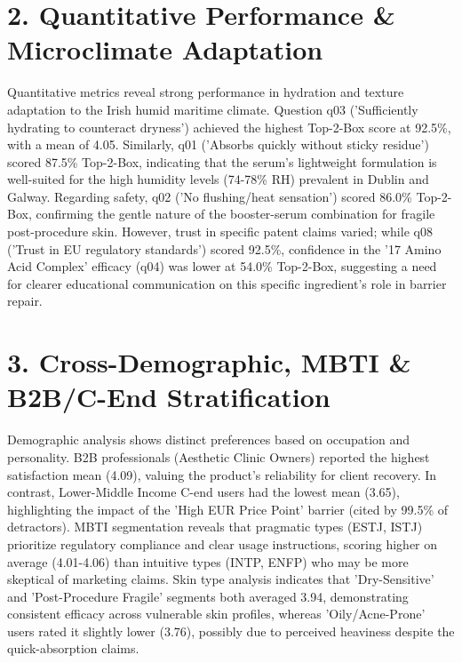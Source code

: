\documentclass[10pt,twocolumn,a4paper]{article}
\begin{document}
\section{2. Quantitative Performance \& Microclimate Adaptation}
Quantitative metrics reveal strong performance in hydration and texture adaptation to the Irish humid maritime climate. Question q03 ('Sufficiently hydrating to counteract dryness') achieved the highest Top-2-Box score at 92.5\%, with a mean of 4.05. Similarly, q01 ('Absorbs quickly without sticky residue') scored 87.5\% Top-2-Box, indicating that the serum's lightweight formulation is well-suited for the high humidity levels (74-78\% RH) prevalent in Dublin and Galway. Regarding safety, q02 ('No flushing/heat sensation') scored 86.0\% Top-2-Box, confirming the gentle nature of the booster-serum combination for fragile post-procedure skin. However, trust in specific patent claims varied; while q08 ('Trust in EU regulatory standards') scored 92.5\%, confidence in the '17 Amino Acid Complex' efficacy (q04) was lower at 54.0\% Top-2-Box, suggesting a need for clearer educational communication on this specific ingredient's role in barrier repair.
\section{3. Cross-Demographic, MBTI \& B2B/C-End Stratification}
Demographic analysis shows distinct preferences based on occupation and personality. B2B professionals (Aesthetic Clinic Owners) reported the highest satisfaction mean (4.09), valuing the product's reliability for client recovery. In contrast, Lower-Middle Income C-end users had the lowest mean (3.65), highlighting the impact of the 'High EUR Price Point' barrier (cited by 99.5\% of detractors). MBTI segmentation reveals that pragmatic types (ESTJ, ISTJ) prioritize regulatory compliance and clear usage instructions, scoring higher on average (4.01-4.06) than intuitive types (INTP, ENFP) who may be more skeptical of marketing claims. Skin type analysis indicates that 'Dry-Sensitive' and 'Post-Procedure Fragile' segments both averaged 3.94, demonstrating consistent efficacy across vulnerable skin profiles, whereas 'Oily/Acne-Prone' users rated it slightly lower (3.76), possibly due to perceived heaviness despite the quick-absorption claims.
\end{document}
